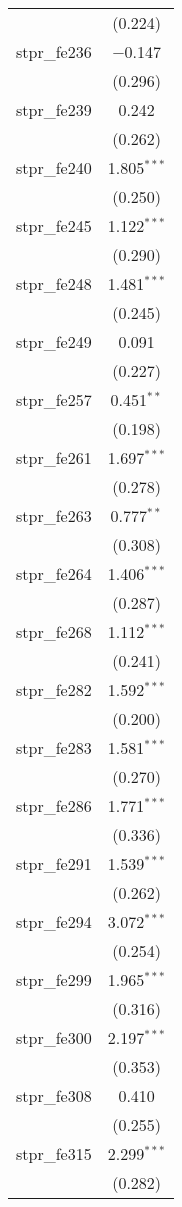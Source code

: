\begin{table}[!htbp]
\begin{tabular}{@{\extracolsep{5pt}}lc}
  & (0.224) \\ 
  stpr\_fe236 & $-$0.147 \\ 
  & (0.296) \\ 
  stpr\_fe239 & 0.242 \\ 
  & (0.262) \\ 
  stpr\_fe240 & 1.805$^{***}$ \\ 
  & (0.250) \\ 
  stpr\_fe245 & 1.122$^{***}$ \\ 
  & (0.290) \\ 
  stpr\_fe248 & 1.481$^{***}$ \\ 
  & (0.245) \\ 
  stpr\_fe249 & 0.091 \\ 
  & (0.227) \\ 
  stpr\_fe257 & 0.451$^{**}$ \\ 
  & (0.198) \\ 
  stpr\_fe261 & 1.697$^{***}$ \\ 
  & (0.278) \\ 
  stpr\_fe263 & 0.777$^{**}$ \\ 
  & (0.308) \\ 
  stpr\_fe264 & 1.406$^{***}$ \\ 
  & (0.287) \\ 
  stpr\_fe268 & 1.112$^{***}$ \\ 
  & (0.241) \\ 
  stpr\_fe282 & 1.592$^{***}$ \\ 
  & (0.200) \\ 
  stpr\_fe283 & 1.581$^{***}$ \\ 
  & (0.270) \\ 
  stpr\_fe286 & 1.771$^{***}$ \\ 
  & (0.336) \\ 
  stpr\_fe291 & 1.539$^{***}$ \\ 
  & (0.262) \\ 
  stpr\_fe294 & 3.072$^{***}$ \\ 
  & (0.254) \\ 
  stpr\_fe299 & 1.965$^{***}$ \\ 
  & (0.316) \\ 
  stpr\_fe300 & 2.197$^{***}$ \\ 
  & (0.353) \\ 
  stpr\_fe308 & 0.410 \\ 
  & (0.255) \\ 
  stpr\_fe315 & 2.299$^{***}$ \\ 
  & (0.282) \\ 

\end{tabular}
\end{table}
